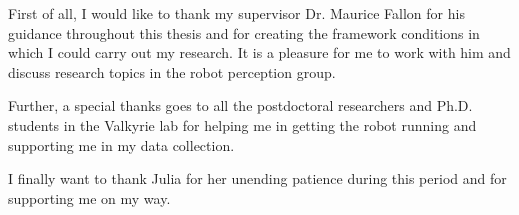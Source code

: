 \begin{acknowledgements}      

First of all, I would like to thank my supervisor Dr. Maurice Fallon for his guidance throughout this thesis and for creating the framework conditions in which I could carry out my research. It is a pleasure for me to work with him and discuss research topics in the robot perception group.

Further, a special thanks goes to all the postdoctoral researchers and Ph.D. students in the Valkyrie lab for helping me in getting the robot running and supporting me in my data collection.

I finally want to thank Julia for her unending patience during this period and for supporting me on my way.

\end{acknowledgements}